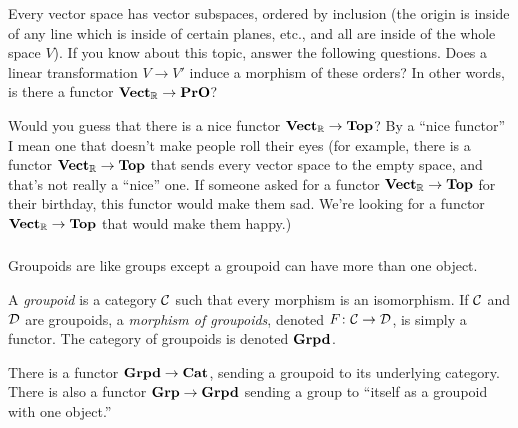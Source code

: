 \begin{exercise}
Every vector space has vector subspaces, ordered by inclusion (the origin is inside of any line which is inside of certain planes, etc., and all are inside of the whole space $V$). If you know about this topic, answer the following questions.
\sexc Does a linear transformation $V\to V'$ induce a morphism of these orders? In other words, is there a functor ${\bf Vect}_{\mathbb R}\rightarrow{\bf PrO}$?
\item Would you guess that there is a nice functor ${\bf Vect}_{\mathbb R}\rightarrow{\bf Top}$? By a “nice functor” I mean one that doesn't make people roll their eyes (for example, there is a functor ${\bf Vect}_{\mathbb R}\rightarrow{\bf Top}$ that sends every vector space to the empty space, and that's not really a “nice” one. If someone asked for a functor ${\bf Vect}_{\mathbb R}\rightarrow{\bf Top}$ for their birthday, this functor would make them sad. We're looking for a functor ${\bf Vect}_{\mathbb R}\rightarrow{\bf Top}$ that would make them happy.)
\endsexc
\end{exercise}



\subsubsection{}\label{sec:groupoid}

Groupoids are like groups except a groupoid can have more than one object. 

\begin{definition}

A {\em groupoid} is a category $\mathcal{C}$ such that every morphism is an isomorphism. If $\mathcal{C}$ and $\mathcal{D}$ are groupoids, a {\em morphism of groupoids}, denoted $F\colon\mathcal{C}\rightarrow\mathcal{D}$, is simply a functor. The category of groupoids is denoted ${\bf Grpd}$.

\end{definition}

\begin{example}

There is a functor ${\bf Grpd}\rightarrow{\bf Cat}$, sending a groupoid to its underlying category. There is also a functor ${\bf Grp}\rightarrow{\bf Grpd}$ sending a group to “itself as a groupoid with one object.” 

\end{example}

